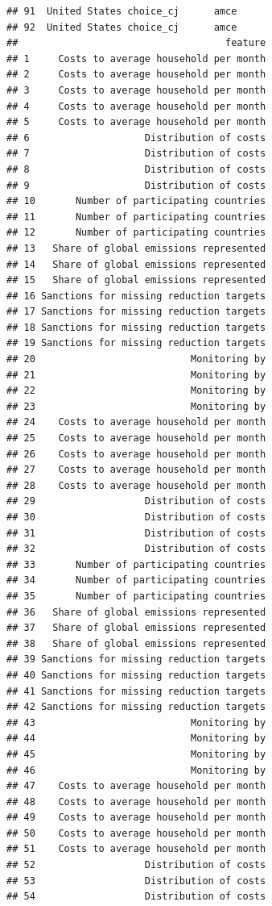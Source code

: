 \documentclass[a4paper,12pt]{article}\usepackage[]{graphicx}\usepackage[]{color}
\makeatletter
\newenvironment{kframe}{%
 \def\at@end@of@kframe{}%
 \ifinner\ifhmode%
  \def\at@end@of@kframe{\end{minipage}}%
  \begin{minipage}{\columnwidth}%
 \fi\fi%
 \def\FrameCommand##1{\hskip\@totalleftmargin \hskip-\fboxsep
 \colorbox{shadecolor}{##1}\hskip-\fboxsep
     \hskip-\linewidth \hskip-\@totalleftmargin \hskip\columnwidth}%
 \MakeFramed {\advance\hsize-\width
   \@totalleftmargin\z@ \linewidth\hsize
   \@setminipage}}%
 {\par\unskip\endMakeFramed%
 \at@end@of@kframe}
\newenvironment{knitrout}{}{} %
\makeatother
\begin{document}
\begin{knitrout}
\begin{kframe}
\begin{verbatim}
## 91  United States choice_cj      amce
## 92  United States choice_cj      amce
##                                    feature
## 1     Costs to average household per month
## 2     Costs to average household per month
## 3     Costs to average household per month
## 4     Costs to average household per month
## 5     Costs to average household per month
## 6                    Distribution of costs
## 7                    Distribution of costs
## 8                    Distribution of costs
## 9                    Distribution of costs
## 10       Number of participating countries
## 11       Number of participating countries
## 12       Number of participating countries
## 13   Share of global emissions represented
## 14   Share of global emissions represented
## 15   Share of global emissions represented
## 16 Sanctions for missing reduction targets
## 17 Sanctions for missing reduction targets
## 18 Sanctions for missing reduction targets
## 19 Sanctions for missing reduction targets
## 20                           Monitoring by
## 21                           Monitoring by
## 22                           Monitoring by
## 23                           Monitoring by
## 24    Costs to average household per month
## 25    Costs to average household per month
## 26    Costs to average household per month
## 27    Costs to average household per month
## 28    Costs to average household per month
## 29                   Distribution of costs
## 30                   Distribution of costs
## 31                   Distribution of costs
## 32                   Distribution of costs
## 33       Number of participating countries
## 34       Number of participating countries
## 35       Number of participating countries
## 36   Share of global emissions represented
## 37   Share of global emissions represented
## 38   Share of global emissions represented
## 39 Sanctions for missing reduction targets
## 40 Sanctions for missing reduction targets
## 41 Sanctions for missing reduction targets
## 42 Sanctions for missing reduction targets
## 43                           Monitoring by
## 44                           Monitoring by
## 45                           Monitoring by
## 46                           Monitoring by
## 47    Costs to average household per month
## 48    Costs to average household per month
## 49    Costs to average household per month
## 50    Costs to average household per month
## 51    Costs to average household per month
## 52                   Distribution of costs
## 53                   Distribution of costs
## 54                   Distribution of costs

\end{verbatim}
\end{kframe}
\end{knitrout}
\end{document}
